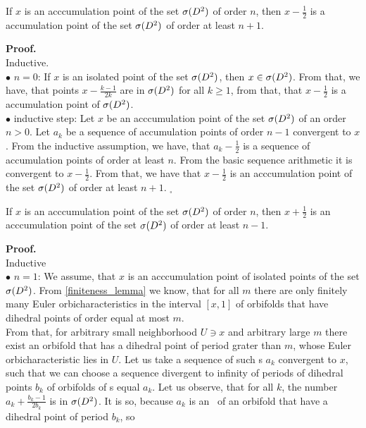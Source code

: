 \begin{lemma}\label{first_order_lemma}
If $x$ is an acccumulation point of the set ${{\sigma}(D^2)}$ of order $n$, then $x-\frac{1}{2}$ is a
 accumulation point of the set ${{\sigma}(D^2)}$ of order at least $n+1$. 
\end{lemma}
\textbf{Proof.} \\
Inductive. \\
$\bullet$ $n = 0$: If $x$ is an isolated point of the set ${{\sigma}(D^2)}$, then $x \in {{\sigma}(D^2)}$. 
From that, we 
have, that points $x - \frac{k-1}{2k}$ are in ${{\sigma}(D^2)}$ for all $k \geq 1$, from that, that 
$x-\frac{1}{2}$ is a 
accumulation point of ${{\sigma}(D^2)}$. \\
$\bullet$ inductive step: Let $x$ be an acccumulation point of the set ${{\sigma}(D^2)}$ of an order 
$n > 0$. 
Let $a_k$ be a sequence of accumulation points of order $n-1$ convergent to $x$. From the 
inductive assumption, we have, that $a_k - \frac{1}{2}$ is a sequence of accumulation points 
of order at least $n$. From the basic sequence arithmetic it is convergent to $x-\frac{1}{2}$. 
From that, we have that $x-\frac{1}{2}$ is an acccumulation point of the set ${{\sigma}(D^2)}$ of order 
at least $n+1$. $_\square$
\begin{lemma}\label{second_order_lemma}
If $x$ is an acccumulation point of the set ${{\sigma}(D^2)}$ of order $n$, then $x+\frac{1}{2}$ is 
an acccumulation point of the set ${{\sigma}(D^2)}$ of order at least $n-1$.  
\end{lemma}
\noindent\textbf{Proof.} \\  
Inductive \\
$\bullet$ $n = 1$: We assume, that $x$ is an acccumulation point of isolated points of the set 
${{\sigma}(D^2)}$. 
From \ref{finiteness_lemma} we know, that for all $m$ there are only finitely many 
Euler orbicharacteristics 
in the interval $[x,1]$ of orbifolds that have dihedral points of order equal at most $m$. \\ 
From that, for arbitrary small neighborhood $U \ni x$ and arbitrary large $m$ there exist 
an orbifold 
that has a dihedral point of period grater than $m$, whose Euler orbicharacteristic lies in $U$. 
Let us take a sequence of such \Eoc s $a_k$ convergent to $x$, such that we can choose 
a sequence divergent to infinity of periods of dihedral points $b_k$ of orbifolds of \Eoc s 
equal $a_k$. 
Let us observe, that for all $k$, the number $a_k+\frac{b_k-1}{2b_k}$ is in ${{\sigma}(D^2)}$. 
It is so, because $a_k$ is an \Eoc\ of an orbifold that have a dihedral point of period $b_k$, so 
